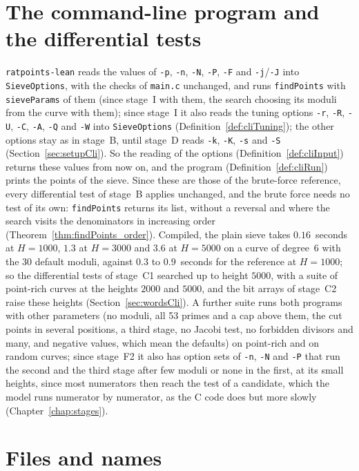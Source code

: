 \section{The command-line program and the differential tests}\label{sec:sieveCli}

\verb|ratpoints-lean| reads the values of \verb|-p|, \verb|-n|, \verb|-N|, \verb|-P|, \verb|-F| and
\verb|-j|/\verb|-J| into \verb|SieveOptions|, with the checks of \verb|main.c| unchanged, and runs
\verb|findPoints| with \verb|sieveParams| of them (since stage~I with them, the search choosing its
moduli from the curve with them); since stage~I it also reads the tuning options \verb|-r|,
\verb|-R|, \verb|-U|, \verb|-C|, \verb|-A|, \verb|-Q| and \verb|-W| into \verb|SieveOptions|
(Definition~\ref{def:cliTuning}); the other options stay as in stage~B, until stage~D reads
\verb|-k|, \verb|-K|, \verb|-s| and \verb|-S| (Section~\ref{sec:setupCli}). So the reading of the
options (Definition~\ref{def:cliInput}) returns these values from now on, and the program
(Definition~\ref{def:cliRun}) prints the points of the sieve. Since these are those of the
brute-force reference, every differential test of stage~B applies unchanged, and the brute force
needs no test of its own: \verb|findPoints| returns its list, without a reversal and where the
search visits the denominators in increasing order (Theorem~\ref{thm:findPoints_order}). Compiled,
the plain sieve takes $0.16$~seconds at $H = 1000$, $1.3$ at $H = 3000$ and $3.6$ at $H = 5000$ on a
curve of degree~$6$ with the 30 default moduli, against $0.3$ to $0.9$~seconds for the reference at
$H = 1000$; so the differential tests of stage~C1 searched up to height $5000$, with a suite of
point-rich curves at the heights $2000$ and $5000$, and the bit arrays of stage~C2 raise these
heights (Section~\ref{sec:wordsCli}). A further suite runs both programs with other parameters (no
moduli, all 53 primes and a cap above them, the cut points in several positions, a third stage, no
Jacobi test, no forbidden divisors and many, and negative values, which mean the defaults) on
point-rich and on random curves; since stage~F2 it also has option sets of \verb|-n|, \verb|-N| and
\verb|-P| that run the second and the third stage after few moduli or none in the first, at its
small heights, since most numerators then reach the test of a candidate, which the model runs
numerator by numerator, as the C code does but more slowly (Chapter~\ref{chap:stages}).

\section{Files and names}

